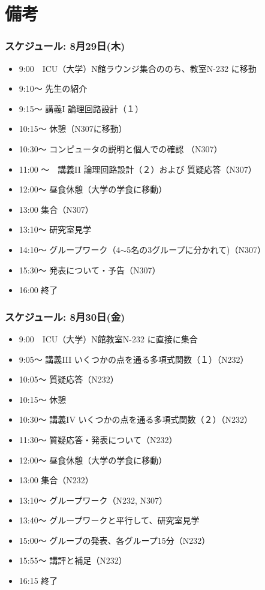 \documentclass[10pt, dvipdfmx]{beamer}
\begin{document}
\section{備考}
\begin{frame}
\frametitle{スケジュール: 8月29日(木)}
\begin{itemize}
\item 9:00　ICU（大学）N館ラウンジ集合ののち、教室N-232 に移動
\item 9:10〜 先生の紹介
\item 9:15〜 講義I 論理回路設計（１）
\item 10:15〜 休憩（N307に移動）
\item 10:30〜 コンピュータの説明と個人での確認 （N307）
\item 11:00 〜　講義II 論理回路設計（２）および 質疑応答（N307）
\item 12:00〜 昼食休憩（大学の学食に移動） 
\item 13:00 集合（N307） 
\item 13:10〜 研究室見学 
\item 14:10〜 グループワーク（4$\sim$5名の3グループに分かれて)（N307） 
\item 15:30〜 発表について・予告（N307） 
\item 16:00 終了 
\end{itemize}
\end{frame}
\begin{frame}
\frametitle{スケジュール: 8月30日(金)}
\begin{itemize}
\item 9:00　ICU（大学）N館教室N-232 に直接に集合 
\item 9:05〜 講義III いくつかの点を通る多項式関数（１）（N232） 
\item 10:05〜 質疑応答（N232） 
\item 10:15〜 休憩 
\item 10:30〜 講義IV いくつかの点を通る多項式関数（２）（N232） 
\item 11:30〜 質疑応答・発表について（N232） 
\item 12:00〜 昼食休憩（大学の学食に移動） 
\item 13:00 集合（N232） 
\item 13:10〜 グループワーク（N232, N307） 
\item 13:40〜 グループワークと平行して、研究室見学　 
\item 15:00〜 グループの発表、各グループ15分（N232） 
\item 15:55〜 講評と補足（N232） 
\item 16:15 終了 
\end{itemize}
\end{frame}
\end{document}
